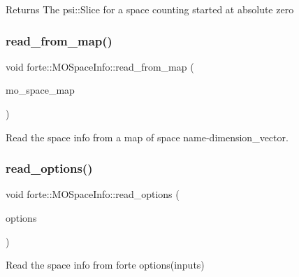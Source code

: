\begin{DoxyReturn}{Returns}
The psi\+::\+Slice for a space counting started at absolute zero 
\end{DoxyReturn}
\mbox{\label{classforte_1_1_m_o_space_info_ab22c8f0b84fdecdf94c583eb27ca4420}} 
\subsubsection{\texorpdfstring{read\+\_\+from\+\_\+map()}{read\_from\_map()}}
{\footnotesize\ttfamily void forte\+::\+M\+O\+Space\+Info\+::read\+\_\+from\+\_\+map (\begin{DoxyParamCaption}\item[{std\+::map$<$ std\+::string, std\+::vector$<$ size\+\_\+t $>$$>$ \&}]{mo\+\_\+space\+\_\+map }\end{DoxyParamCaption})}



Read the space info from a map of space name-\/dimension\+\_\+vector. 

\mbox{\label{classforte_1_1_m_o_space_info_a05576541580654229b4dbea3c9f39e24}} 
\subsubsection{\texorpdfstring{read\+\_\+options()}{read\_options()}}
{\footnotesize\ttfamily void forte\+::\+M\+O\+Space\+Info\+::read\+\_\+options (\begin{DoxyParamCaption}\item[{std\+::shared\+\_\+ptr$<$ \mbox{\hyperlink{classforte_1_1_forte_options}{Forte\+Options}} $>$}]{options }\end{DoxyParamCaption})}



Read the space info from forte options(inputs) 

\mbox{\label{classforte_1_1_m_o_space_info_a39e62f3f0cdad4fa40f98a86b0eaf5e2}} 

